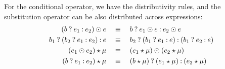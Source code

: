 For the conditional operator, we have the distributivity rules, and the
substitution operator can be also distributed across expressions:
\begin{equation}
    \begin{aligned}
        \left(\select{b}{e_1}{e_2}\right) \odot e
        & \quad \eqrel \quad
        \select{b}{e_1 \odot e}{e_2 \odot e} \\
        \select{b_1}{\left(\select{b_2}{e_1}{e_2}\right)}{e}
        & \quad \eqrel \quad
        \select{b_2}{%
            \left(\select{b_1}{e_1}{e}\right)}{%
            \left(\select{b_1}{e_2}{e}\right)} \\
        \left( e_1 \odot e_2 \right) \expand \mu
        & \quad \eqrel \quad
        \left( e_1 \expand \mu \right) \odot \left( e_2 \expand \mu \right) \\
        \left( \select{b}{e_1}{e_2} \right) \expand \mu
        & \quad \eqrel \quad
        \select{%
            \left( b \expand \mu \right)}{%
            \left( e_1 \expand \mu \right)}{%
            \left( e_2 \expand \mu \right)}
    \end{aligned}
\end{equation}

